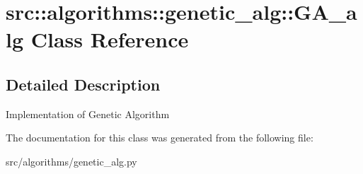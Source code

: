 \hypertarget{classsrc_1_1algorithms_1_1genetic__alg_1_1GA__alg}{
\section{src::algorithms::genetic\_\-alg::GA\_\-alg Class Reference}
\label{classsrc_1_1algorithms_1_1genetic__alg_1_1GA__alg}
}


\subsection{Detailed Description}
\begin{DoxyVerb}
Implementation of Genetic Algorithm
\end{DoxyVerb}
 

The documentation for this class was generated from the following file:\begin{DoxyCompactItemize}
\item 
src/algorithms/genetic\_\-alg.py\end{DoxyCompactItemize}
